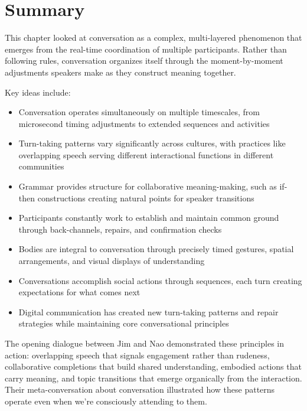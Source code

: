 \section{Summary}

This chapter looked at conversation as a complex, multi-layered phenomenon that emerges from the real-time coordination of multiple participants. Rather than following rules, conversation organizes itself through the moment-by-moment adjustments speakers make as they construct meaning together.

Key ideas include:

\begin{itemize}[noitemsep]
\item Conversation operates simultaneously on multiple timescales, from microsecond timing adjustments to extended sequences and activities
\item Turn-taking patterns vary significantly across cultures, with practices like overlapping speech serving different interactional functions in different communities
\item Grammar provides structure for collaborative meaning-making, such as if-then constructions creating natural points for speaker transitions
\item Participants constantly work to establish and maintain common ground through back-channels, repairs, and confirmation checks
\item Bodies are integral to conversation through precisely timed gestures, spatial arrangements, and visual displays of understanding
\item Conversations accomplish social actions through sequences, each turn creating expectations for what comes next
\item Digital communication has created new turn-taking patterns and repair strategies while maintaining core conversational principles
\end{itemize}

The opening dialogue between Jim and Nao demonstrated these principles in action: overlapping speech that signals engagement rather than rudeness, collaborative completions that build shared understanding, embodied actions that carry meaning, and topic transitions that emerge organically from the interaction. Their meta-conversation about conversation illustrated how these patterns operate even when we're consciously attending to them.

